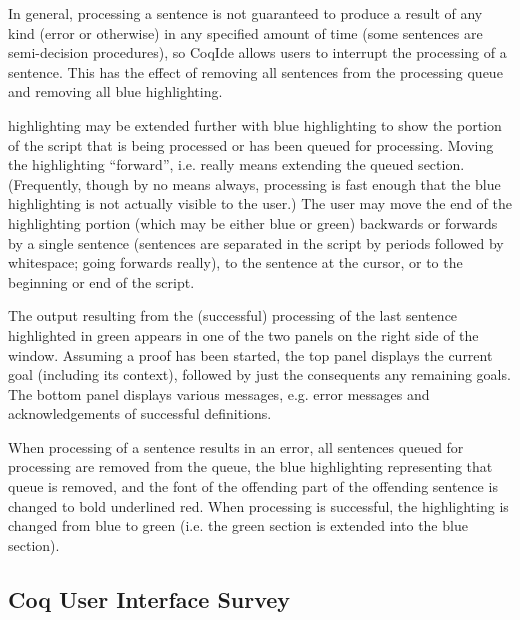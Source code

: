 \documentclass[11pt]{amsart}
\begin{document}
In general, processing a sentence is not guaranteed to produce a result of any kind (error or otherwise) in any specified amount of time (some sentences are semi-decision procedures), so CoqIde allows users to interrupt the processing of a sentence.  This has the effect of removing all sentences from the processing queue and removing all blue highlighting. 


highlighting may be extended further with blue highlighting to show the portion of the script that is being processed or has been queued for processing.  Moving the highlighting ``forward'', i.e. really means extending the queued section.  (Frequently, though by no means always, processing is fast enough that the blue highlighting is not actually visible to the user.)  The user may move the end of the highlighting portion (which may be either blue or green) backwards or forwards by a single sentence (sentences are separated in the script by periods followed by whitespace; going forwards really), to the sentence at the cursor, or to the beginning or end of the script.  

The output resulting from the (successful) processing of the last sentence highlighted in green appears in one of the two panels on the right side of the window.  Assuming a proof has been started, the top panel displays the current goal (including its context), followed by just the consequents any remaining goals. The bottom panel displays various messages, e.g. error messages and acknowledgements of successful definitions.

When processing of a sentence results in an error, all sentences queued for processing are removed from the queue, the blue highlighting representing that queue is removed, and the font of the offending part of the offending sentence is changed to bold underlined red. When processing is successful, the highlighting is changed from blue to green (i.e. the green section is extended into the blue section).





\subsection{Coq User Interface Survey}
\end{document}

